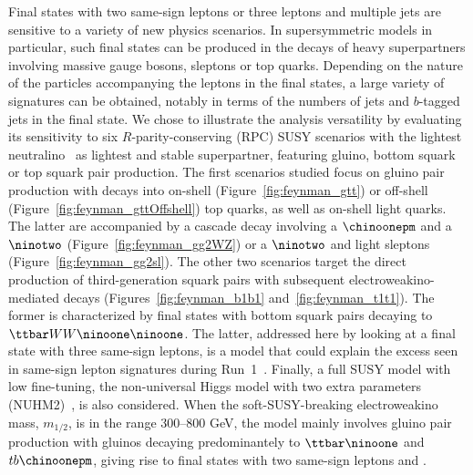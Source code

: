 Final states with two same-sign leptons or three leptons and multiple jets are sensitive to a variety of new physics scenarios. 
In supersymmetric models in particular, such final states can be produced 
in the decays of heavy superpartners involving massive gauge bosons, sleptons or top quarks. 
Depending on the nature of the particles accompanying the leptons in the final states, 
a large variety of signatures can be obtained, notably in terms of the numbers of jets and $b$-tagged jets in the final state. 
We chose to illustrate the analysis versatility by evaluating its sensitivity to 
six $R$-parity-conserving (RPC) SUSY scenarios with the lightest neutralino \neut\ as lightest and stable superpartner, 
featuring gluino, bottom squark or top squark pair production. 
The first scenarios studied focus on gluino pair production with decays into on-shell (Figure~\ref{fig:feynman_gtt}) 
or off-shell (Figure~\ref{fig:feynman_gttOffshell}) top quarks, as well as on-shell light quarks. The latter are accompanied by a cascade decay involving 
a $\chinoonepm$ and a $\ninotwo$ (Figure~\ref{fig:feynman_gg2WZ}) or a $\ninotwo$ and light sleptons (Figure~\ref{fig:feynman_gg2sl}). 
The other two scenarios target the direct production of third-generation squark pairs 
with subsequent electroweakino-mediated decays (Figures~\ref{fig:feynman_b1b1} and~\ref{fig:feynman_t1t1}). 
The former is characterized by final states with bottom squark pairs decaying to $\ttbar WW\ninoone\ninoone$. The latter, addressed here by 
looking at a final state with three same-sign leptons, is a model that could explain the excess seen in same-sign lepton signatures 
during Run~1~\cite{Huang:2015fba}.
Finally, a full SUSY model with low fine-tuning, the non-universal Higgs model with two extra parameters (NUHM2)~\cite{Ellis:2002iu,Ellis:2002wv}, 
is also considered. When the soft-SUSY-breaking electroweakino mass, $m_{1/2}$, is in the range 300--800 GeV, the model mainly 
involves gluino pair production with gluinos decaying predominantely 
to $\ttbar\ninoone$ and $tb\chinoonepm$, giving rise to final states with two same-sign leptons and \met.

